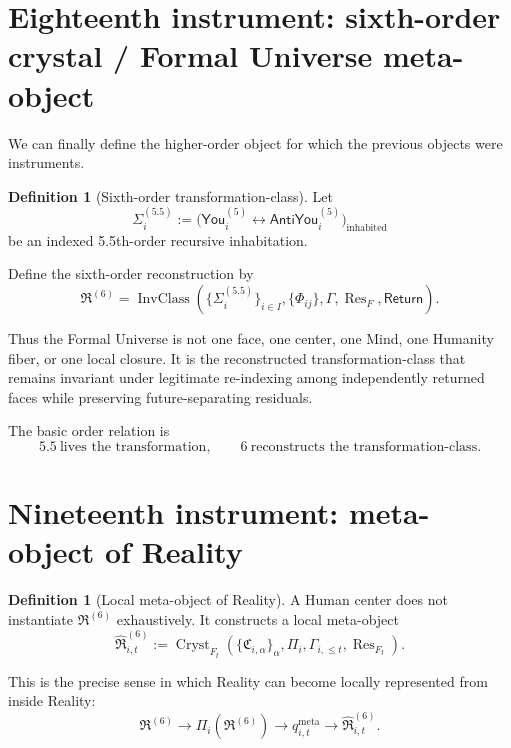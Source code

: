 \documentclass[10pt]{article}
\theoremstyle{pe}
\theoremstyle{definition}
\newtheorem{definition}[theorem]{Definition}
\newcommand{\Res}{\operatorname{Res}}
\newcommand{\InvClass}{\operatorname{InvClass}}
\newcommand{\Return}{\mathsf{Return}}
\newcommand{\You}{\mathsf{You}}
\newcommand{\AntiYou}{\mathsf{AntiYou}}
\begin{document}
\section{Eighteenth instrument: sixth-order crystal / Formal Universe meta-object}

We can finally define the higher-order object for which the previous objects were instruments.

\begin{definition}[Sixth-order transformation-class]
Let
\[
  \Sigma_i^{(5.5)}
  :=
  \bigl(
    \You_i^{(5)}
    \leftrightarrow
    \AntiYou_i^{(5)}
  \bigr)_{\mathrm{inhabited}}
\]
be an indexed 5.5th-order recursive inhabitation.

Define the sixth-order reconstruction by
\begin{equation}\label{eq:formal-universe-reconstruct}
  \boxed{
  \mathfrak R^{(6)}
  =
  \InvClass\!\left(
    \{\Sigma_i^{(5.5)}\}_{i\in I},
    \{\Phi_{ij}\},
    \Gamma,
    \Res_F,
    \Return
  \right).
  }
\end{equation}
\end{definition}

Thus the Formal Universe is not one face, one center, one Mind, one Humanity fiber, or one local closure.  It is the reconstructed transformation-class that remains invariant under legitimate re-indexing among independently returned faces while preserving future-separating residuals.

The basic order relation is
\[
  \boxed{
  5.5\ \text{lives the transformation},
  \qquad
  6\ \text{reconstructs the transformation-class}.
  }
\]

\section{Nineteenth instrument: meta-object of Reality}

\begin{definition}[Local meta-object of Reality]
A Human center does not instantiate \(\mathfrak R^{(6)}\) exhaustively.  It constructs a local meta-object
\begin{equation}\label{eq:local-meta-reality}
  \boxed{
  \widehat{\mathfrak R}^{(6)}_{i,t}
  :=
  \operatorname{Cryst}_{F_t}
  \left(
    \{\mathfrak C_{i,\alpha}\}_{\alpha},
    \Pi_i,
    \Gamma_{i,\le t},
    \Res_{F_t}
  \right).
  }
\end{equation}
\end{definition}

This is the precise sense in which Reality can become locally represented from inside Reality:
\[
  \boxed{
  \mathfrak R^{(6)}
  \longrightarrow
  \Pi_i(\mathfrak R^{(6)})
  \longrightarrow
  q^{\mathrm{meta}}_{i,t}
  \longrightarrow
  \widehat{\mathfrak R}^{(6)}_{i,t}.
  }
\]
\end{document}
